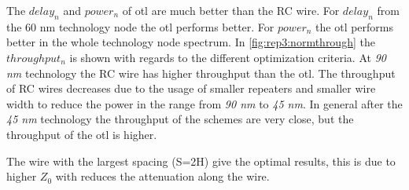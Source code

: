 The $delay_{n}$ and $power_{n}$ of  \ac{otl} are much better than the RC wire. For $delay_{n}$ from the 60 nm technology node the \ac{otl} performs better.
For $power_{n}$ the \ac{otl} performs better in the whole technology node spectrum.
In \cref{fig:rep3:normthrough} the $throughput_{n}$ is shown with regards to the different optimization criteria.
At \textit{90 nm} technology the RC wire has higher throughput than the \ac{otl}.
The throughput of RC wires decreases due to the usage of smaller repeaters and smaller wire width to reduce the power in the range from \textit{90 nm} to \textit{45 nm}.
In general after the \textit{45 nm} technology the throughput of the schemes are very close, but the throughput of the \ac{otl} is higher.

The wire with the largest spacing (S=2H) give the optimal results, this is due to higher $Z_{0}$ with reduces the attenuation along the wire.
